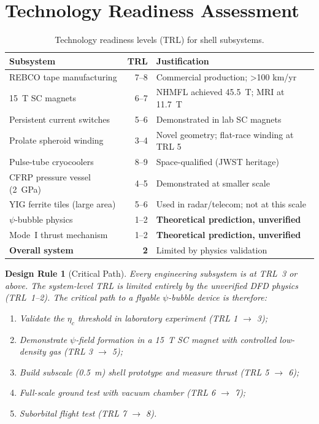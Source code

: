 \documentclass[11pt,a4paper]{article}
\newtheorem{designrule}{Design Rule}
\begin{document}
\section{Technology Readiness Assessment}\label{sec:tra}

\begin{table}[h]
\centering
\caption{Technology readiness levels (TRL) for shell subsystems.}
\label{tab:trl}
\begin{tabular}{@{}lrl@{}}
\toprule
Subsystem & TRL & Justification \\
\midrule
REBCO tape manufacturing & 7--8 & Commercial production; >100 km/yr \\
\SI{15}{T} SC magnets & 6--7 & NHMFL achieved \SI{45.5}{T}; MRI at \SI{11.7}{T} \\
Persistent current switches & 5--6 & Demonstrated in lab SC magnets \\
Prolate spheroid winding & 3--4 & Novel geometry; flat-race winding at TRL 5 \\
Pulse-tube cryocoolers & 8--9 & Space-qualified (JWST heritage) \\
CFRP pressure vessel (\SI{2}{GPa}) & 4--5 & Demonstrated at smaller scale \\
YIG ferrite tiles (large area) & 5--6 & Used in radar/telecom; not at this scale \\
$\psi$-bubble physics & 1--2 & \textbf{Theoretical prediction, unverified} \\
Mode~I thrust mechanism & 1--2 & \textbf{Theoretical prediction, unverified} \\
\midrule
\textbf{Overall system} & \textbf{2} & Limited by physics validation \\
\bottomrule
\end{tabular}
\end{table}

\begin{designrule}[Critical Path]
Every engineering subsystem is at TRL~3 or above. The system-level TRL
is limited entirely by the unverified DFD physics (TRL~1--2). The critical
path to a flyable $\psi$-bubble device is therefore:
\begin{enumerate}[nosep]
\item Validate the $\eta_c$ threshold in laboratory experiment (TRL 1
$\to$ 3);
\item Demonstrate $\psi$-field formation in a \SI{15}{T} SC magnet
with controlled low-density gas (TRL 3 $\to$ 5);
\item Build subscale (\SI{0.5}{m}) shell prototype and measure thrust
(TRL 5 $\to$ 6);
\item Full-scale ground test with vacuum chamber (TRL 6 $\to$ 7);
\item Suborbital flight test (TRL 7 $\to$ 8).
\end{enumerate}
\end{designrule}
\end{document}
